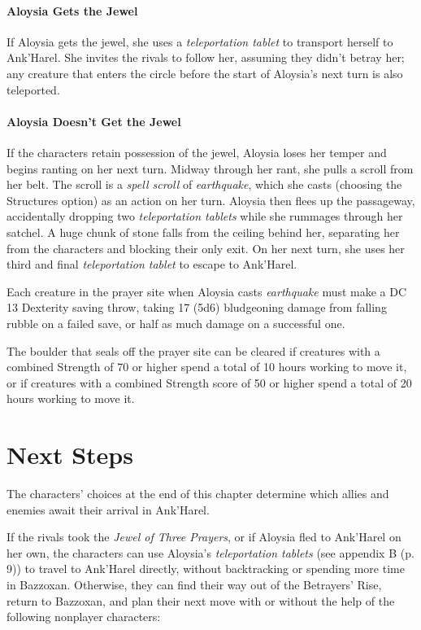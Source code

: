 \documentclass[a4paper, 11pt, bg=full, twocolumn, nooutline]{dndbook}
\begin{document}
\paragraph{Aloysia Gets the Jewel}

If Aloysia gets the jewel, she uses a \textit{teleportation tablet} to transport herself to Ank'Harel. She invites the rivals to follow her, assuming they didn't betray her; any creature that enters the circle before the start of Aloysia's next turn is also teleported.

\paragraph{Aloysia Doesn't Get the Jewel}

If the characters retain possession of the jewel, Aloysia loses her temper and begins ranting on her next turn. Midway through her rant, she pulls a scroll from her belt. The scroll is a \textit{spell scroll} of \textit{earthquake}, which she casts (choosing the Structures option) as an action on her turn. Aloysia then flees up the passageway, accidentally dropping two \textit{teleportation tablets} while she rummages through her satchel. A huge chunk of stone falls from the ceiling behind her, separating her from the characters and blocking their only exit. On her next turn, she uses her third and final \textit{teleportation tablet} to escape to Ank'Harel.

Each creature in the prayer site when Aloysia casts \textit{earthquake} must make a DC 13 Dexterity saving throw, taking 17 (5d6) bludgeoning damage from falling rubble on a failed save, or half as much damage on a successful one.

The boulder that seals off the prayer site can be cleared if creatures with a combined Strength of 70 or higher spend a total of 10 hours working to move it, or if creatures with a combined Strength score of 50 or higher spend a total of 20 hours working to move it.
\section{Next Steps}

The characters' choices at the end of this chapter determine which allies and enemies await their arrival in Ank'Harel.

If the rivals took the \textit{Jewel of Three Prayers}, or if Aloysia fled to Ank'Harel on her own, the characters can use Aloysia's \textit{teleportation tablets} (see appendix B (p. 9)) to travel to Ank'Harel directly, without backtracking or spending more time in Bazzoxan. Otherwise, they can find their way out of the Betrayers' Rise, return to Bazzoxan, and plan their next move with or without the help of the following nonplayer characters:
\end{document}
